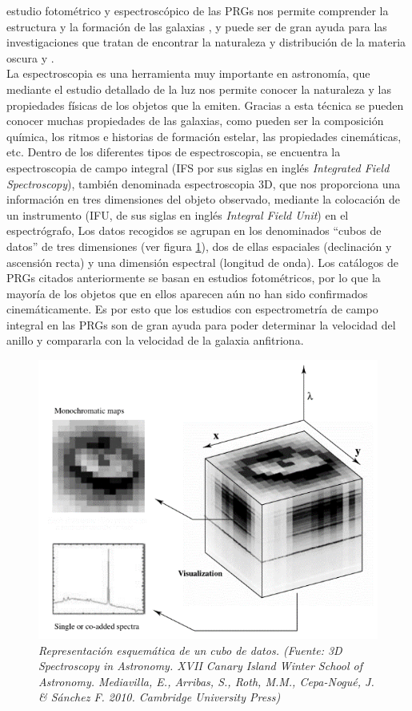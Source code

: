 \documentclass{article}
\begin{document}
estudio fotométrico y espectroscópico de las PRGs nos permite comprender la estructura y la formación de las galaxias \cite{Iodice2014}, y puede ser de gran ayuda para las investigaciones que tratan de encontrar la naturaleza y distribución de la materia oscura \cite{Brook2008} y \cite{Moiseev2008}.\\La espectroscopia es una herramienta muy importante en astronomía, que mediante el estudio detallado de la luz nos permite conocer la naturaleza y las propiedades físicas de los objetos que la emiten. Gracias a esta técnica se pueden conocer muchas propiedades de las galaxias, como pueden ser la composición química, los ritmos e historias de formación estelar, las propiedades cinemáticas, etc. Dentro de los diferentes tipos de espectroscopia, se encuentra la espectroscopia de campo integral (IFS por sus siglas en inglés \emph{Integrated Field Spectroscopy}), también denominada espectroscopia 3D, que nos proporciona una información en tres dimensiones del objeto observado, mediante la colocación de un instrumento (IFU, de sus siglas en inglés \emph{Integral Field Unit}) en el espectrógrafo, Los datos recogidos se agrupan en los denominados “cubos de datos” de tres dimensiones (ver figura \ref{figura 1}), dos de ellas espaciales (declinación y ascensión recta) y una dimensión espectral (longitud de onda). Los catálogos de PRGs citados anteriormente se basan en estudios fotométricos, por lo que la mayoría de los objetos que en ellos aparecen aún no han sido confirmados cinemáticamente. Es por esto que los estudios con espectrometría de campo integral en las PRGs son de gran ayuda para poder determinar la velocidad del anillo y compararla con la velocidad de la galaxia anfitriona.
\begin{figure}[H]
	\includegraphics[scale=.80]{imagen1.png}
	\centering	
	\caption{\emph{Representación esquemática de un cubo de datos. (Fuente: 3D Spectroscopy in Astronomy. XVII Canary Island Winter School of Astronomy. Mediavilla, E., Arribas, S., Roth, M.M., Cepa-Nogué, J. \& Sánchez F. 2010. Cambridge University Press)}}
	\label{figura 1}
\end{figure}
\end{document}
